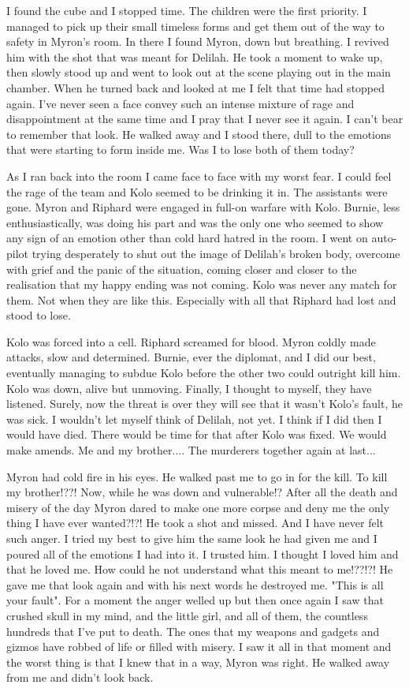 I found the cube and I stopped time. The children were the first priority. I managed to pick up their small timeless forms and get them out of the way to safety in Myron's room. In there I found Myron, down but breathing. I revived him with the shot that was meant for Delilah. He took a moment to wake up, then slowly stood up and went to look out at the scene playing out in the main chamber. When he turned back and looked at me I felt that time had stopped again. I've never seen a face convey such an intense mixture of rage and disappointment at the same time and I pray that I never see it again. I can't bear to remember that look. He walked away and I stood there, dull to the emotions that were starting to form inside me. Was I to lose both of them today?\medskip

As I ran back into the room I came face to face with my worst fear. I could feel the rage of the team and Kolo seemed to be drinking it in. The assistants were gone. Myron and Riphard were engaged in full-on warfare with Kolo. Burnie, less enthusiastically, was doing his part and was the only one who seemed to show any sign of an emotion other than cold hard hatred in the room. I went on auto-pilot trying desperately to shut out the image of Delilah's broken body, overcome with grief and the panic of the situation, coming closer and closer to the realisation that my happy ending was not coming. Kolo was never any match for them. Not when they are like this. Especially with all that Riphard had lost and stood to lose.\medskip

Kolo was forced into a cell. Riphard screamed for blood. Myron coldly made attacks, slow and determined. Burnie, ever the diplomat, and I did our best, eventually managing to subdue Kolo before the other two could outright kill him. Kolo was down, alive but unmoving. Finally, I thought to myself, they have listened. Surely, now the threat is over they will see that it wasn't Kolo's fault, he was sick. I wouldn't let myself think of Delilah, not yet. I think if I did then I would have died. There would be time for that after Kolo was fixed. We would make amends. Me and my brother.... The murderers together again at last...\medskip

Myron had cold fire in his eyes. He walked past me to go in for the kill. To kill my brother!??! Now, while he was down and vulnerable!? After all the death and misery of the day Myron dared to make one more corpse and deny me the only thing I have ever wanted?!?! He took a shot and missed. And I have never felt such anger. I tried my best to give him the same look he had given me and I poured all of the emotions I had into it. I trusted him. I thought I loved him and that he loved me. How could he not understand what this meant to me!??!?! He gave me that look again and with his next words he destroyed me. "This is all your fault". For a moment the anger welled up but then once again I saw that crushed skull in my mind, and the little girl, and all of them, the countless hundreds that I've put to death. The ones that my weapons and gadgets and gizmos have robbed of life or filled with misery. I saw it all in that moment and the worst thing is that I knew that in a way, Myron was right. He walked away from me and didn't look back.\medskip

